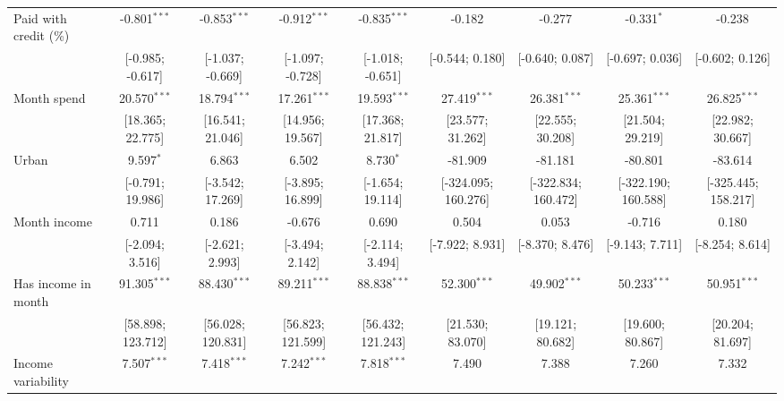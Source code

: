 \begin{table}[htbp]
\begin{threeparttable}[b]
\begin{tabular}{lcccccccc}
         Paid with credit (\%)       & -0.801$^{***}$    & -0.853$^{***}$     & -0.912$^{***}$     & -0.835$^{***}$    & -0.182              & -0.277              & -0.331$^{*}$        & -0.238\\   
                                     & [-0.985; -0.617]  & [-1.037; -0.669]   & [-1.097; -0.728]   & [-1.018; -0.651]  & [-0.544; 0.180]     & [-0.640; 0.087]     & [-0.697; 0.036]     & [-0.602; 0.126]\\   
         Month spend                 & 20.570$^{***}$    & 18.794$^{***}$     & 17.261$^{***}$     & 19.593$^{***}$    & 27.419$^{***}$      & 26.381$^{***}$      & 25.361$^{***}$      & 26.825$^{***}$\\   
                                     & [18.365; 22.775]  & [16.541; 21.046]   & [14.956; 19.567]   & [17.368; 21.817]  & [23.577; 31.262]    & [22.555; 30.208]    & [21.504; 29.219]    & [22.982; 30.667]\\   
         Urban                       & 9.597$^{*}$       & 6.863              & 6.502              & 8.730$^{*}$       & -81.909             & -81.181             & -80.801             & -83.614\\   
                                     & [-0.791; 19.986]  & [-3.542; 17.269]   & [-3.895; 16.899]   & [-1.654; 19.114]  & [-324.095; 160.276] & [-322.834; 160.472] & [-322.190; 160.588] & [-325.445; 158.217]\\   
         Month income                & 0.711             & 0.186              & -0.676             & 0.690             & 0.504               & 0.053               & -0.716              & 0.180\\   
                                     & [-2.094; 3.516]   & [-2.621; 2.993]    & [-3.494; 2.142]    & [-2.114; 3.494]   & [-7.922; 8.931]     & [-8.370; 8.476]     & [-9.143; 7.711]     & [-8.254; 8.614]\\   
         Has income in month         & 91.305$^{***}$    & 88.430$^{***}$     & 89.211$^{***}$     & 88.838$^{***}$    & 52.300$^{***}$      & 49.902$^{***}$      & 50.233$^{***}$      & 50.951$^{***}$\\   
                                     & [58.898; 123.712] & [56.028; 120.831]  & [56.823; 121.599]  & [56.432; 121.243] & [21.530; 83.070]    & [19.121; 80.682]    & [19.600; 80.867]    & [20.204; 81.697]\\   
         Income variability          & 7.507$^{***}$     & 7.418$^{***}$      & 7.242$^{***}$      & 7.818$^{***}$     & 7.490               & 7.388               & 7.260               & 7.332\\   

\end{tabular}
\end{threeparttable}
\end{table}
